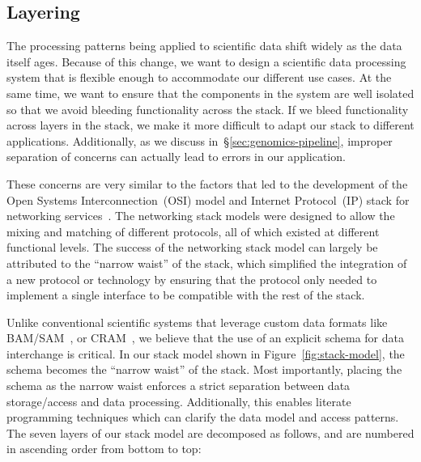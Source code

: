 \documentclass[10pt]{report} %
\begin{document}
\subsection{Layering}
\label{sec:layering}

The processing patterns being applied to scientific data shift widely
as the data itself ages. Because of this change, we want to design a scientific data processing system that is
flexible enough to accommodate our different use cases. At the same time, we want to ensure that the
components in the system are well isolated so that we avoid bleeding functionality across the stack. If
we bleed functionality across layers in the stack, we make it more difficult to adapt our stack to different
applications. Additionally, as we discuss in~\S\ref{sec:genomics-pipeline}, improper separation of
concerns can actually lead to errors in our application.

These concerns are very similar to the factors that led to the development of the Open Systems
Interconnection~(OSI) model and Internet Protocol~(IP) stack for networking
services~\cite{zimmermann80}. The networking stack models were designed to allow the mixing and
matching of different protocols, all of which existed at different functional levels. The success of the
networking stack model can largely be attributed to the ``narrow waist'' of the stack, which simplified the
integration of a new protocol or technology by ensuring that the protocol only needed to implement a
single interface to be compatible with the rest of the stack.

Unlike conventional scientific systems that leverage custom data formats like BAM/SAM~\cite{li09},
or CRAM~\cite{fritz11}, we believe that the use of an explicit schema for data interchange is critical.
In our stack model shown in Figure~\ref{fig:stack-model}, the schema becomes the ``narrow waist''
of the stack. Most importantly, placing the schema as the narrow waist enforces a strict separation
between data storage/access and data processing. Additionally, this enables literate programming
techniques which can clarify the data model and access patterns. The seven layers of our stack model
are decomposed as follows, and are numbered in ascending order from bottom to top:
\end{document}
